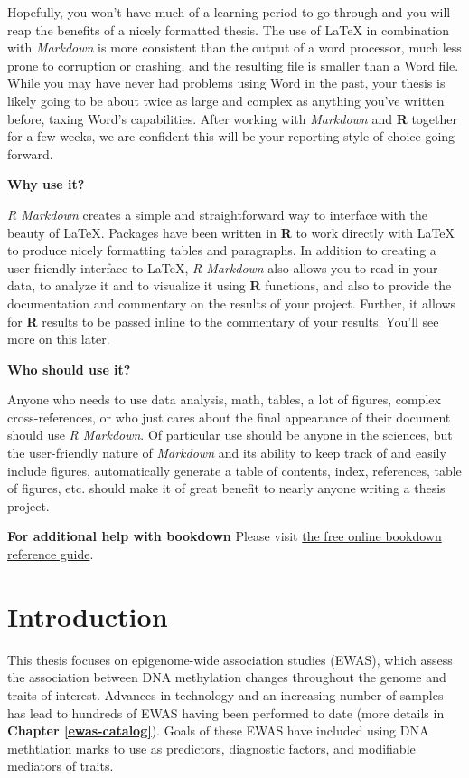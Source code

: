\documentclass[11pt,twoside]{bristolthesis}
\begin{document}
Hopefully, you won't have much of a learning period to go through and you will reap the benefits of a nicely formatted thesis. The use of LaTeX in combination with \emph{Markdown} is more consistent than the output of a word processor, much less prone to corruption or crashing, and the resulting file is smaller than a Word file. While you may have never had problems using Word in the past, your thesis is likely going to be about twice as large and complex as anything you've written before, taxing Word's capabilities. After working with \emph{Markdown} and \textbf{R} together for a few weeks, we are confident this will be your reporting style of choice going forward.

\textbf{Why use it?}

\emph{R Markdown} creates a simple and straightforward way to interface with the beauty of LaTeX. Packages have been written in \textbf{R} to work directly with LaTeX to produce nicely formatting tables and paragraphs. In addition to creating a user friendly interface to LaTeX, \emph{R Markdown} also allows you to read in your data, to analyze it and to visualize it using \textbf{R} functions, and also to provide the documentation and commentary on the results of your project. Further, it allows for \textbf{R} results to be passed inline to the commentary of your results. You'll see more on this later.

\textbf{Who should use it?}

Anyone who needs to use data analysis, math, tables, a lot of figures, complex cross-references, or who just cares about the final appearance of their document should use \emph{R Markdown}. Of particular use should be anyone in the sciences, but the user-friendly nature of \emph{Markdown} and its ability to keep track of and easily include figures, automatically generate a table of contents, index, references, table of figures, etc. should make it of great benefit to nearly anyone writing a thesis project.

\textbf{For additional help with bookdown}
Please visit \href{https://bookdown.org/yihui/bookdown/}{the free online bookdown reference guide}.

\hypertarget{introduction}{%
\chapter{Introduction}\label{introduction}}

This thesis focuses on epigenome-wide association studies (EWAS), which assess the association between DNA methylation changes throughout the genome and traits of interest. Advances in technology and an increasing number of samples has lead to hundreds of EWAS having been performed to date (more details in \textbf{Chapter \ref{ewas-catalog}}). Goals of these EWAS have included using DNA methtlation marks to use as predictors, diagnostic factors, and modifiable mediators of traits.
\end{document}
